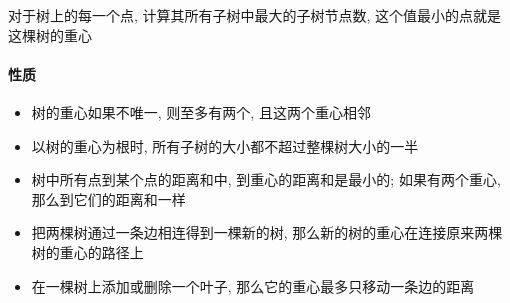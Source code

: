 对于树上的每一个点, 计算其所有子树中最大的子树节点数, 这个值最小的点就是这棵树的重心

\paragraph{性质}

\begin{itemize}
    \item 树的重心如果不唯一, 则至多有两个, 且这两个重心相邻
    \item 以树的重心为根时, 所有子树的大小都不超过整棵树大小的一半
    \item 树中所有点到某个点的距离和中, 到重心的距离和是最小的; 如果有两个重心, 那么到它们的距离和一样
    \item 把两棵树通过一条边相连得到一棵新的树, 那么新的树的重心在连接原来两棵树的重心的路径上
    \item 在一棵树上添加或删除一个叶子, 那么它的重心最多只移动一条边的距离
\end{itemize}
